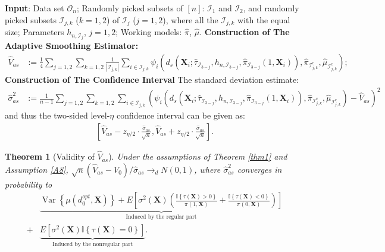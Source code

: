 \documentclass[11pt]{article}
\theoremstyle{referenceplain}
\newtheorem{theorem}{Theorem}
\theoremstyle{referencedefinition}
\theoremstyle{referenceremark}
\begin{document}
\begin{algorithm}
\caption{The Adaptive Smoothing Estimator and Its Confidence Interval}
    \begin{algorithmic}[1]
        \State \textbf{Input}: Data set $\mathcal{O}_n$; Randomly picked subsets of $[n]$: $\mathcal{I}_1$ and $\mathcal{I}_2$, and randomly picked subsets $\mathcal{I}_{j,k}$ ($k=1,2$) of $\mathcal{I}_j$ ($j=1,2$), where all the $\mathcal{I}_{j,k}$ with the equal size; Parameters $h_{n,\mathcal{I}_j}$, $j=1,2$; Working models: $\widehat{\pi}$, $\widehat{\mu}$.
        \State \textbf{Construction of 
 The Adaptive Smoothing Estimator:} 
 \begin{align}
     \widehat{V}_{as}&:= \frac{1}{4}\sum_{j=1,2}\sum_{k=1,2}\frac{1}{|\mathcal{I}_{j,k}|}\sum_{i\in\mathcal{I}_{j,k}}\psi_i(d_{s}(\mathbf{X}_i;\widehat{\tau}_{\mathcal{I}_{3-j}},h_{n,\mathcal{I}_{3-j}},\widehat{\pi}_{\mathcal{I}_{3-j}}(1,\mathbf{X}_i)),\widehat{\pi}_{\mathcal{I}_{j,k}^c},\widehat{\mu}_{\mathcal{I}_{j,k}^c});\label{sin-opt-est}
 \end{align}
 \State \textbf{Construction of The Confidence Interval} The standard deviation estimate:
 \begin{align}
    \widehat{\sigma}_{as}^2&:=\frac{1}{n-1}\sum_{j=1,2}\sum_{k=1,2}\sum_{i\in\mathcal{I}_{j,k}}\left(\psi_i(d_{s}(\mathbf{X}_i;\widehat{\tau}_{\mathcal{I}_{3-j}},h_{n,\mathcal{I}_{3-j}},\widehat{\pi}_{\mathcal{I}_{3-j}}(1,\mathbf{X}_i)),\widehat{\pi}_{\mathcal{I}_{j,k}^c},\widehat{\mu}_{\mathcal{I}_{j,k}^c})-\widehat{V}_{as}\right)^2\label{sin-opt-std}
 \end{align}
 and thus the two-sided level-{$\eta$} confidence interval can be given as:
 \begin{align*}
     \left[\widehat{V}_{as}-{z_{\eta/2}}\cdot\frac{\widehat{\sigma}_{as}}{\sqrt{n}},\widehat{V}_{as}+{z_{\eta/2}}\cdot\frac{\widehat{\sigma}_{as}}{\sqrt{n}}\right].
 \end{align*}
    \end{algorithmic}
    \label{alg1}
\end{algorithm}
\begin{theorem}[Validity of $\widehat{V}_{as}$]\label{ef-opt}
Under the assumptions of Theorem \ref{thm1} and Assumption \ref{A8}, $\sqrt{n}(\widehat{V}_{as}-V_0)/\widehat{\sigma}_{as}\to_d N(0,1)$,  where $\widehat{\sigma}_{as}^2$ converges in probability to
 \begin{align*}
     &\underbrace{\operatorname{Var}\left\{\mu\left(d_0^{o p t}, \mathbf{X}\right)\right\} + E\left[{\sigma^2(\mathbf{X})}\left(\frac{\mathbb{I}\left\{\tau\left(\mathbf{X}\right)>0\right\}}{\pi\left(1, \mathbf{X}\right)}+\frac{\mathbb{I}\left\{\tau\left(\mathbf{X}\right)<0\right\}}{\pi\left(0, \mathbf{X}\right)}\right)\right]}_{\text{Induced by the regular part}}\\
    +& \underbrace{E\left[{\sigma^2(\mathbf{X})} \mathbb{I}\left\{\tau\left(\mathbf{X}\right)=0\right\}\right]}_{\text{Induced by the nonregular part}}.
 \end{align*}
\end{theorem}
\end{document}
